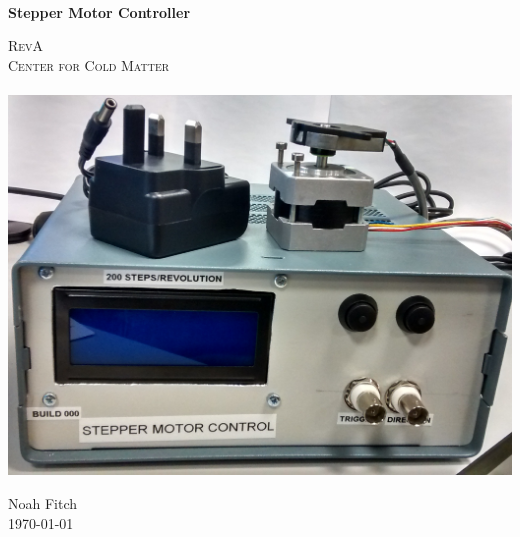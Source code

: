 \begin{titlepage}
\begin{center}


\HRule \\[0.4cm]
{ \huge \bfseries Stepper Motor Controller \\[0.4cm] }

\textsc{\Large RevA}\\[0.5cm]
\textsc{\Large Center for Cold Matter}\\[0.5cm]

\HRule \\[1.5cm]

\centering
\includegraphics[width=\linewidth]{Figures/Built_Box2.jpg}

\vfill

{\large Noah Fitch} \\
{\large \today}

\end{center}
\end{titlepage}